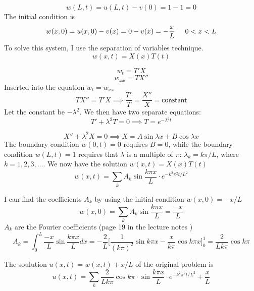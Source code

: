 \documentclass{article}
\begin{document}
\begin{equation*}
w(L,t) = u(L,t)-v(0)= 1 - 1 = 0
\end{equation*}
The initial condition is 
\begin{equation*}
w(x,0) = u(x,0)-v(x)= 0 - v(x) = -\frac{x}{L} \hspace{0.5cm} 0<x<L
\end{equation*}
To solve this system, I use the separation of variables technique. 
\begin{equation*}
w(x,t) = X(x)T(t)
\end{equation*}

$$w_t = T'X$$
$$w_{xx} = TX''$$
Inserted into the equation $w_t=w_{xx}$
$$TX''=T'X \implies \frac{T'}{T} = \frac{X''}{X} =\mathsf{ constant}$$
Let the constant be $-\lambda ^2$. We then have two separate equations:
\begin{equation*}
T' + \lambda^2 T = 0 \implies T=e^{-\lambda^2 t}
\end{equation*}

\begin{equation*}
X'' + \lambda^2X = 0 \implies X=A \sin \lambda x + B\cos \lambda x
\end{equation*}
The boundary condition $w(0,t) = 0$ requires $B=0$, while the boundary condition $w(L,t)=1$ requires that $\lambda$ is a multiple of $\pi$: $\lambda_k = k\pi /L$, where $k = 1,2,3,...$. 
We now have the solution $w(x,t)=X(x)T(t)$
\begin{equation*}
w(x,t) = \sum_k A_k \sin \frac{k \pi x}{L}\cdot e^{-k^2\pi^2 t /L^2}
\end{equation*}

I can find the coefficients $A_k$ by using the initial condition $w(x,0)=-x/L$
\begin{equation*}
w(x,0) = \sum_k A_k \sin \frac{k \pi x}{L}= \frac{-x}{L}
\end{equation*}
$A_k$ are the Fourier coefficients (page 19 in the lecture notes \cite{PDE})
\begin{equation*}
A_k = \int_0^L\frac{-x}{L} \sin \frac{k \pi x}{L} dx = - \frac{2}{L}\bigg[\frac{1}{(k\pi)^2} \sin k \pi x - \frac{x}{k\pi}\cos k\pi x \bigg]_0^1 = \frac{2}{Lk\pi}\cos k\pi
\end{equation*}

The soulution $u(x,t) = w(x,t) + x/L$ of the original problem is 
\begin{equation}
u(x,t)=\sum_k \frac{2}{Lk\pi}\cos k\pi \cdot \sin \frac{k\pi x}{L} \cdot e^{-k^2\pi^2 t /L^2} + \frac{x}{L}
\end{equation}
\end{document}
